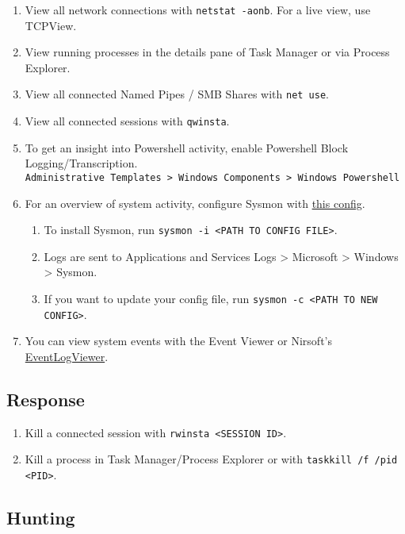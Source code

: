 \documentclass[12pt,letterpaper]{article}
\def\code#1{\textcolor{iris}{\texttt{#1}}}
\begin{document}
\begin{enumerate}
	\item View all network connections with \code{netstat -aonb}. For a live view, use TCPView.
	\item View running processes in the details pane of Task Manager or via Process Explorer.
	\item View all connected Named Pipes / SMB Shares with \code{net use}.
	\item View all connected sessions with \code{qwinsta}.
	\item To get an insight into Powershell activity, enable Powershell Block Logging/Transcription. \\
		\code{Administrative Templates > Windows Components > Windows Powershell}
	\item For an overview of system activity, configure Sysmon with \href{https://github.com/D42H5/cyber_comp_resources/blob/main/sysmonconfig-export-modified-2-2-24.xml}{this config}.
	\begin{enumerate}
		\item To install Sysmon, run \code{sysmon -i <PATH TO CONFIG FILE>}.
		\item Logs are sent to Applications and Services Logs > Microsoft > Windows > Sysmon.
		\item If you want to update your config file, run \code{sysmon -c <PATH TO NEW CONFIG>}.
	\end{enumerate}
	\item You can view system events with the Event Viewer or Nirsoft's \href{https://www.nirsoft.net/utils/fulleventlogview-x64.zip}{EventLogViewer}.
\end{enumerate}

\subsection{Response}

\begin{enumerate}
	\item Kill a connected session with \code{rwinsta <SESSION ID>}.
	\item Kill a process in Task Manager/Process Explorer or with \code{taskkill /f /pid <PID>}.
\end{enumerate}

\subsection{Hunting}
\end{document}
